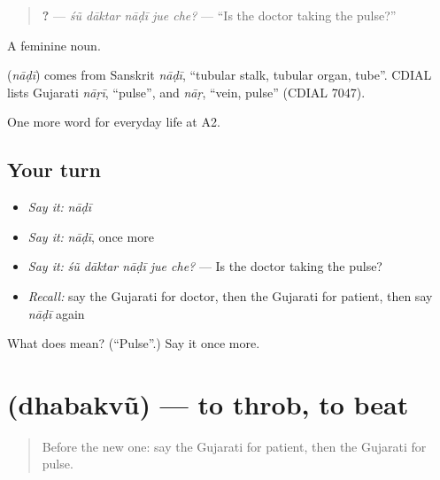 \begin{quote}
\textbf{    ?} — \emph{śũ dāktar nāḍī jue che?} — \textquotedblleft{}Is the doctor taking the pulse?\textquotedblright{}
\end{quote}

A feminine noun.

\begin{cousinweb}
\textbf{} (\emph{nāḍī}) comes from Sanskrit \emph{nāḍī}, \textquotedblleft{}tubular stalk, tubular organ, tube\textquotedblright{}. CDIAL lists Gujarati \emph{nāṛī}, \textquotedblleft{}pulse\textquotedblright{}, and \emph{nāṛ}, \textquotedblleft{}vein, pulse\textquotedblright{} (CDIAL 7047).
\end{cousinweb}

\begin{grammarlens}[title={What you've built}]
One more word for everyday life at A2.
\end{grammarlens}

\subsection*{Your turn}
\begin{itemize}
\raggedright
  \item \emph{Say it:} \emph{nāḍī}
  \item \emph{Say it:} \emph{nāḍī}, once more
  \item \emph{Say it:} \emph{śũ dāktar nāḍī jue che?} — Is the doctor taking the pulse?
  \item \emph{Recall:} say the Gujarati for doctor, then the Gujarati for patient, then say \emph{nāḍī} again
\end{itemize}

\begin{tcolorbox}[breakable,colback=teal!4,colframe=teal!35!black,title={Before you move on}]
What does  mean? (\textquotedblleft{}Pulse\textquotedblright{}.) Say it once more.
\end{tcolorbox}
\section[\texorpdfstring{\gu{ધબકવું} (dhabakvũ)}{ધબકવું (dhabakvũ)}]{ (dhabakvũ) — to throb, to beat}

\label{lesson:GU-C224-dhabakvu}



\begin{quote}
Before the new one: say the Gujarati for patient, then the Gujarati for pulse.
\end{quote}

